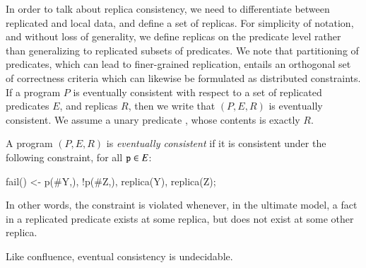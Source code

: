 In order to talk about replica consistency, we need to differentiate between replicated
and local
data, and define a set of replicas.  
For simplicity of notation, and without loss of generality, we define replicas on the predicate level rather than generalizing to replicated subsets of predicates.  
We note that partitioning of predicates, which can lead to finer-grained replication, 
entails an orthogonal set of correctness criteria which can likewise be formulated as
distributed constraints.
If a \lang program $P$ is eventually consistent with respect to a set of replicated predicates $E$, and replicas $R$, then we write that $(P, E, R)$ is eventually consistent.  We assume a unary predicate , whose contents is exactly $R$.


\begin{definition}
\label{def:ec}
A \lang program $(P, E, R)$ is {\em eventually consistent} if it is consistent under the following constraint, for all $\dedalus{p} \in E$:

\begin{Dedalus}
fail() <- p(#Y,), !p(#Z,), replica(Y), replica(Z);
\end{Dedalus}

In other words, the constraint is violated whenever, in the ultimate model, a fact in a replicated predicate exists at some replica, but does not exist at some other replica.
\end{definition}


Like confluence, eventual consistency is undecidable.

